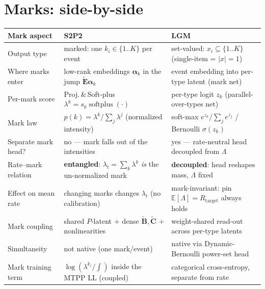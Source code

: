 \documentclass[11pt]{article}
\newcommand{\softplus}{\operatorname{softplus}}
\newcommand{\Lam}{\Lambda}
\begin{document}
\section{Marks: side-by-side}
\renewcommand{\arraystretch}{1.3}
\begin{center}\small
\begin{tabular}{>{\raggedright\arraybackslash}p{3.0cm} >{\raggedright\arraybackslash}p{5.8cm} >{\raggedright\arraybackslash}p{5.8cm}}
\toprule
\textbf{Mark aspect} & \textbf{S2P2} & \textbf{LGM}\\
\midrule
Output type & marked: one $k_i\in\{1..K\}$ per event & set-valued: $x_i\subseteq\{1..K\}$ (single-item = $|x|{=}1$)\\
Where marks enter & low-rank embeddings $\boldsymbol\alpha_k$ in the jump $\tilde{\mathbf E}\boldsymbol\alpha_k$ & event embedding into per-type latent (mark net)\\
Per-mark score & Proj.\,\&\,Soft-plus $\lambda^k=s_k\softplus(\cdot)$ & per-type logit $z_k$ (parallel-over-types net)\\
Mark law & $p(k)=\lambda^k/\sum_j\lambda^j$ (normalized intensity) & soft-max $e^{z_k}/\sum_j e^{z_j}$ / Bernoulli $\sigma(z_k)$\\
Separate mark head? & no --- mark falls out of the intensities & yes --- rate-neutral head decoupled from $\Lam$\\
Rate--mark relation & \textbf{entangled}: $\lambda_t=\sum_k\lambda^k$ \emph{is} the un-normalized mark & \textbf{decoupled}: head reshapes mass, $\Lam$ fixed\\
Effect on mean rate & changing marks changes $\lambda_t$ (no calibration) & mark-invariant: pin $\mathbb{E}[\Lam]=R_{\mathrm{target}}$ always holds\\
Mark coupling & shared $P$-latent $+$ dense $\tilde{\mathbf B},\tilde{\mathbf C}$ $+$ nonlinearities & weight-shared read-out across per-type latents\\
Simultaneity & not native (one mark/event) & native via Dynamic-Bernoulli power-set head\\
Mark training term & $\log(\lambda^{k_i}/\!\int)$ inside the MTPP LL (coupled) & categorical cross-entropy, separate from rate\\
\bottomrule
\end{tabular}
\end{center}
\end{document}
